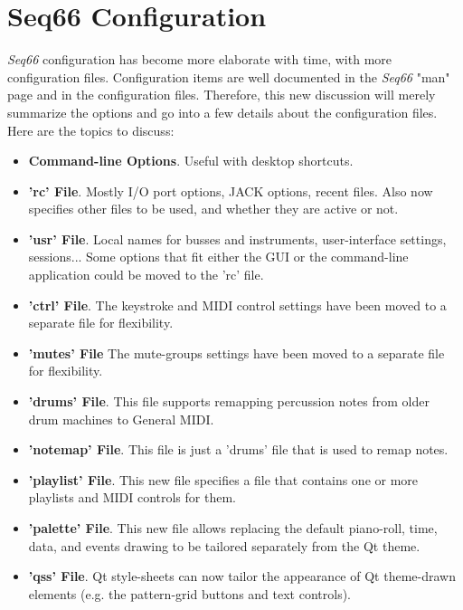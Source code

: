 %
%
%

\section{Seq66 Configuration}
\label{sec:configuration}

   \textsl{Seq66} configuration has become more elaborate with time, with more
   configuration files.
   Configuration items are well documented in the
   \textsl{Seq66} "man" page and in the configuration files.
   Therefore, this new discussion will merely summarize the options and
   go into a few details about the configuration files.
   Here are the topics to discuss:

   \begin{itemize}
      \item \textbf{Command-line Options}. Useful with desktop shortcuts.
      \item \textbf{'rc' File}. Mostly I/O port options, JACK options, recent
         files.  Also now specifies other files to be used, and whether they
         are active or not.
      \item \textbf{'usr' File}. Local names for busses and instruments,
         user-interface settings, sessions... Some options that fit either the
         GUI or the command-line application could be moved to the 'rc' file.
      \item \textbf{'ctrl' File}. The keystroke and MIDI control settings have
         been moved to a separate file for flexibility.
      \item \textbf{'mutes' File} The mute-groups settings have
         been moved to a separate file for flexibility.
      \item \textbf{'drums' File}.  This file supports remapping percussion
         notes from older drum machines to General MIDI.
      \item \textbf{'notemap' File}.  This file is just a 'drums' file
         that is used to remap notes.
      \item \textbf{'playlist' File}. This new file specifies a file that
         contains one or more playlists and MIDI controls for them.
      \item \textbf{'palette' File}. This new file allows replacing the default
         piano-roll, time, data, and events drawing to be tailored separately
         from the Qt theme.
      \item \textbf{'qss' File}.  Qt style-sheets can now tailor the appearance
         of Qt theme-drawn elements
         (e.g. the pattern-grid buttons and text controls).
   \end{itemize}

